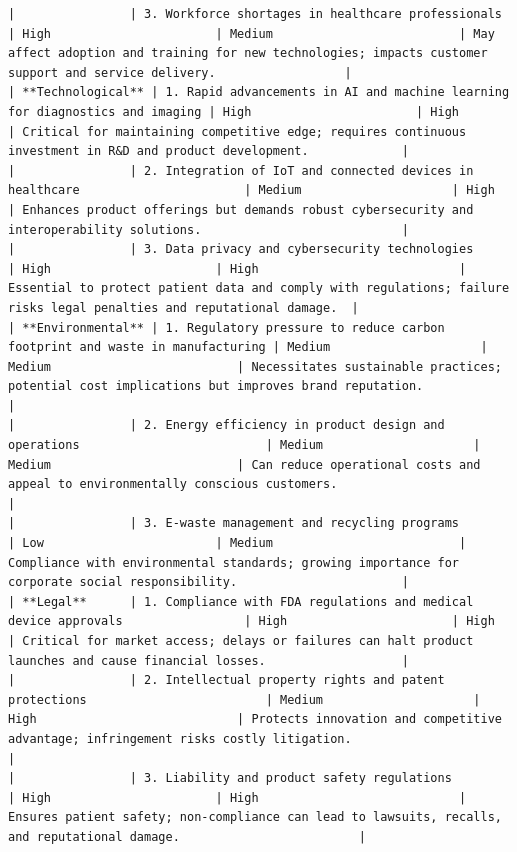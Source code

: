 \begin{instructbox}
\begin{lstlisting}[breakindent=0pt, breaklines=true, breakatwhitespace=true, frame=single, backgroundcolor=\color{green!10}]
|                | 3. Workforce shortages in healthcare professionals                              | High                       | Medium                          | May affect adoption and training for new technologies; impacts customer support and service delivery.                  |
| **Technological** | 1. Rapid advancements in AI and machine learning for diagnostics and imaging | High                       | High                            | Critical for maintaining competitive edge; requires continuous investment in R&D and product development.             |
|                | 2. Integration of IoT and connected devices in healthcare                       | Medium                     | High                            | Enhances product offerings but demands robust cybersecurity and interoperability solutions.                            |
|                | 3. Data privacy and cybersecurity technologies                                 | High                       | High                            | Essential to protect patient data and comply with regulations; failure risks legal penalties and reputational damage.  |
| **Environmental** | 1. Regulatory pressure to reduce carbon footprint and waste in manufacturing | Medium                     | Medium                          | Necessitates sustainable practices; potential cost implications but improves brand reputation.                         |
|                | 2. Energy efficiency in product design and operations                          | Medium                     | Medium                          | Can reduce operational costs and appeal to environmentally conscious customers.                                        |
|                | 3. E-waste management and recycling programs                                  | Low                        | Medium                          | Compliance with environmental standards; growing importance for corporate social responsibility.                       |
| **Legal**      | 1. Compliance with FDA regulations and medical device approvals                 | High                       | High                            | Critical for market access; delays or failures can halt product launches and cause financial losses.                   |
|                | 2. Intellectual property rights and patent protections                         | Medium                     | High                            | Protects innovation and competitive advantage; infringement risks costly litigation.                                   |
|                | 3. Liability and product safety regulations                                   | High                       | High                            | Ensures patient safety; non-compliance can lead to lawsuits, recalls, and reputational damage.                         |


\end{lstlisting}
\end{instructbox}
